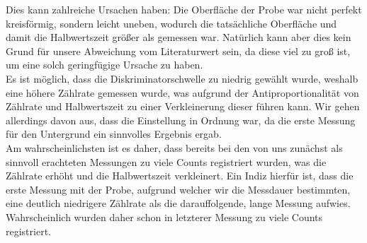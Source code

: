    Dies kann zahlreiche Ursachen haben: Die Oberfläche der Probe war nicht perfekt kreisförmig, sondern leicht uneben, wodurch die tatsächliche Oberfläche und damit die Halbwertszeit größer als gemessen war. Natürlich kann aber dies kein Grund für unsere Abweichung vom Literaturwert sein, da diese viel zu groß ist, um eine solch geringfügige Ursache zu haben. \\
   Es ist möglich, dass die Diskriminatorschwelle zu niedrig gewählt wurde, weshalb eine höhere Zählrate gemessen wurde, was aufgrund der Antiproportionalität von Zählrate und Halbwertszeit zu einer Verkleinerung dieser führen kann. Wir gehen allerdings davon aus, dass die Einstellung in Ordnung war, da die erste Messung für den Untergrund ein sinnvolles Ergebnis ergab.\\
   Am wahrscheinlichsten ist es daher, dass bereits bei den von uns zunächst als sinnvoll erachteten Messungen zu viele Counts registriert wurden, was die Zählrate erhöht und die Halbwertszeit verkleinert. Ein Indiz hierfür ist, dass die erste Messung mit der Probe, aufgrund welcher wir die Messdauer bestimmten, eine deutlich niedrigere Zählrate als die darauffolgende, lange Messung aufwies. Wahrscheinlich wurden daher schon in letzterer Messung zu viele Counts registriert.